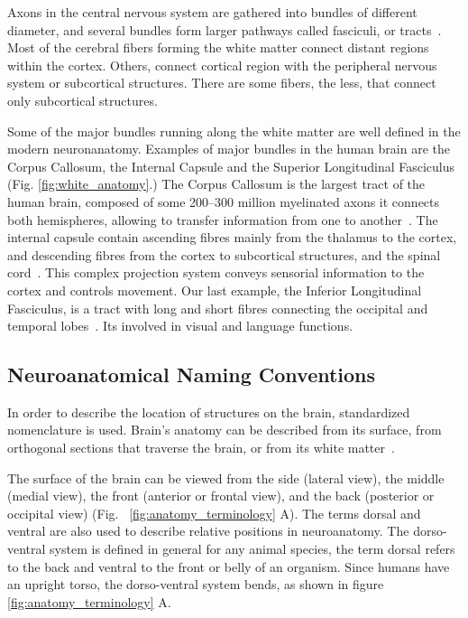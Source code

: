 Axons in the central nervous system are gathered into bundles of different
diameter, and several bundles form larger pathways called fasciculi, or tracts~\cite{Catani2012}.
Most of the cerebral fibers forming the white matter connect distant regions 
within the cortex. Others, connect cortical region with the peripheral nervous
system or subcortical structures. There are some fibers, the less, that connect
only subcortical structures.

Some of the major bundles running along the white matter are well defined in the
modern neuronanatomy. Examples of major bundles in the human brain are the
Corpus Callosum, the Internal Capsule and the Superior Longitudinal Fasciculus
(Fig. \ref{fig:white_anatomy}.)
The Corpus Callosum is the largest tract of the human brain, composed of some
200–300 million myelinated axons it connects both hemispheres, allowing to
transfer information from one to another~\cite{Catani2012}. The internal capsule
contain ascending fibres mainly from the thalamus to the cortex, and descending
fibres from the cortex to subcortical structures, and the spinal cord~\cite{Catani2012}.
This complex projection system conveys sensorial information to the cortex and 
controls movement. Our last example, the Inferior Longitudinal Fasciculus, is
a tract with long and short fibres connecting the occipital and temporal lobes~\cite{Catani2012}.
Its involved in visual and language functions.

\subsection{Neuroanatomical Naming Conventions}

In order to describe the location of structures on the brain, standardized
nomenclature is used. Brain's anatomy can be described from its surface,
from orthogonal sections that traverse the brain, or from its white matter~\cite{Catani2012}.

The surface of the brain can be viewed from the side (lateral view),
the middle (medial view), the front (anterior or frontal view), and the back
(posterior or occipital view) (Fig. ~\ref{fig:anatomy_terminology} A). The
terms dorsal and ventral are also used to describe relative positions in neuroanatomy.
The dorso-ventral system is defined in general for any animal species, the term
dorsal refers to the back and ventral to the front or belly of an organism. Since
humans have an upright torso, the dorso-ventral system bends, as shown in figure
\ref{fig:anatomy_terminology} A.


